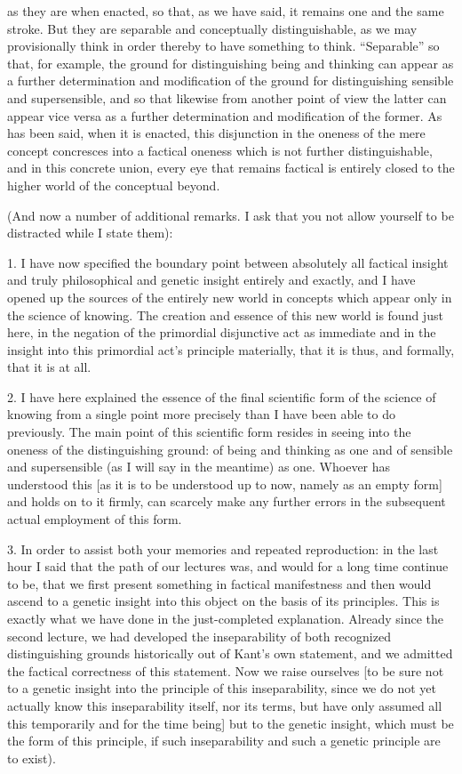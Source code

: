 as they are when enacted, so that, as we have said,
it remains one and the same stroke.
But they are separable and conceptually distinguishable,
as we may provisionally think in order thereby
to have something to think.
“Separable” so that, for example, the ground for
distinguishing being and thinking can appear as
a further determination and modification of
the ground for distinguishing sensible and supersensible,
and so that likewise from another point of view
the latter can appear vice versa as
a further determination and modification of the former.
As has been said, when it is enacted,
this disjunction in the oneness of the mere concept
concresces into a factical oneness which is not further distinguishable,
and in this concrete union, every eye that remains factical is
entirely closed to the higher world of the conceptual beyond.

(And now a number of additional remarks.
I ask that you not allow yourself to be
distracted while I state them):

1. I have now specified the boundary point
between absolutely all factical insight
and truly philosophical and genetic insight
entirely and exactly,
and I have opened up the sources of
the entirely new world in concepts
which appear only in the science of knowing.
The creation and essence of this new world is found just here,
in the negation of the primordial disjunctive act as immediate
and in the insight into this primordial act's principle
materially, that it is thus, and formally, that it is at all.

2. I have here explained the essence of
the final scientific form of the science of knowing
from a single point more precisely
than I have been able to do previously.
The main point of this scientific form
resides in seeing into the oneness
of the distinguishing ground:
of being and thinking as one
and of sensible and supersensible
(as I will say in the meantime) as one.
Whoever has understood this
[as it is to be understood up to now,
namely as an empty form]
and holds on to it firmly,
can scarcely make any further errors
in the subsequent actual employment of this form.

3. In order to assist both your memories and repeated reproduction:
in the last hour I said that the path of our lectures was,
and would for a long time continue to be,
that we first present something
in factical manifestness
and then would ascend to
a genetic insight into this object
on the basis of its principles.
This is exactly what we have done
in the just-completed explanation.
Already since the second lecture,
we had developed the inseparability of
both recognized distinguishing grounds
historically out of Kant's own statement,
and we admitted the factical correctness
of this statement.
Now we raise ourselves
[to be sure not to a genetic insight
into the principle of this inseparability,
since we do not yet actually know
this inseparability itself, nor its terms,
but have only assumed all this temporarily
and for the time being]
but to the genetic insight,
which must be the form of this principle,
if such inseparability and
such a genetic principle are to exist).

